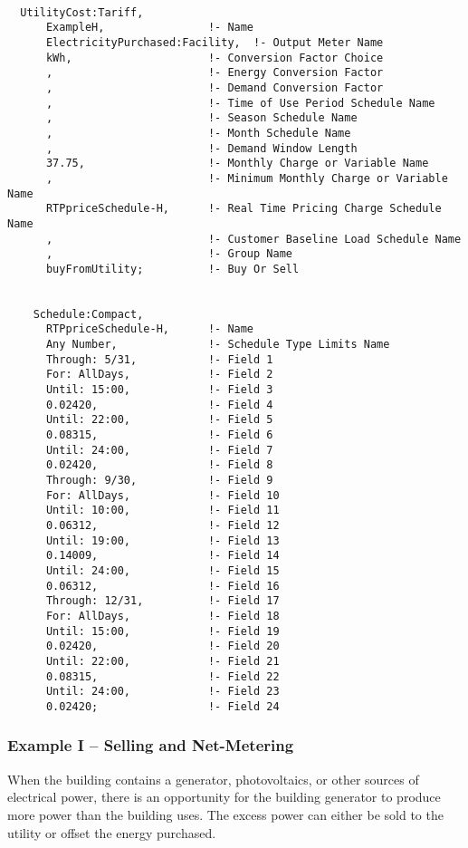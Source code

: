 \begin{lstlisting}

  UtilityCost:Tariff,
      ExampleH,                !- Name
      ElectricityPurchased:Facility,  !- Output Meter Name
      kWh,                     !- Conversion Factor Choice
      ,                        !- Energy Conversion Factor
      ,                        !- Demand Conversion Factor
      ,                        !- Time of Use Period Schedule Name
      ,                        !- Season Schedule Name
      ,                        !- Month Schedule Name
      ,                        !- Demand Window Length
      37.75,                   !- Monthly Charge or Variable Name
      ,                        !- Minimum Monthly Charge or Variable Name
      RTPpriceSchedule-H,      !- Real Time Pricing Charge Schedule Name
      ,                        !- Customer Baseline Load Schedule Name
      ,                        !- Group Name
      buyFromUtility;          !- Buy Or Sell


    Schedule:Compact,
      RTPpriceSchedule-H,      !- Name
      Any Number,              !- Schedule Type Limits Name
      Through: 5/31,           !- Field 1
      For: AllDays,            !- Field 2
      Until: 15:00,            !- Field 3
      0.02420,                 !- Field 4
      Until: 22:00,            !- Field 5
      0.08315,                 !- Field 6
      Until: 24:00,            !- Field 7
      0.02420,                 !- Field 8
      Through: 9/30,           !- Field 9
      For: AllDays,            !- Field 10
      Until: 10:00,            !- Field 11
      0.06312,                 !- Field 12
      Until: 19:00,            !- Field 13
      0.14009,                 !- Field 14
      Until: 24:00,            !- Field 15
      0.06312,                 !- Field 16
      Through: 12/31,          !- Field 17
      For: AllDays,            !- Field 18
      Until: 15:00,            !- Field 19
      0.02420,                 !- Field 20
      Until: 22:00,            !- Field 21
      0.08315,                 !- Field 22
      Until: 24:00,            !- Field 23
      0.02420;                 !- Field 24
\end{lstlisting}

\subsubsection{Example I -- Selling and Net-Metering}\label{example-i-selling-and-net-metering}

When the building contains a generator, photovoltaics, or other sources of electrical power, there is an opportunity for the building generator to produce more power than the building uses. The excess power can either be sold to the utility or offset the energy purchased.

